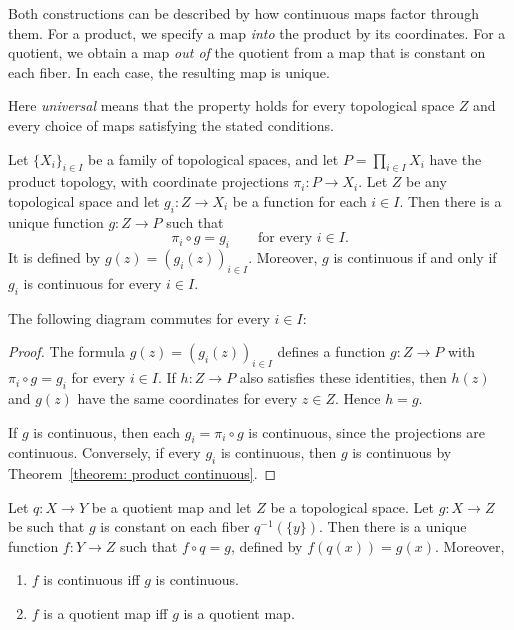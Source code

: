 Both constructions can be described by how continuous maps factor through them. For a product, we specify a map \emph{into} the product by its coordinates. For a quotient, we obtain a map \emph{out of} the quotient from a map that is constant on each fiber. In each case, the resulting map is unique.

Here \emph{universal} means that the property holds for every topological space $Z$ and every choice of maps satisfying the stated conditions.

\begin{theorem}
\label{theorem: product universal property}
Let $\{X_i\}_{i\in I}$ be a family of topological spaces, and let $P=\prod_{i\in I}X_i$ have the product topology, with coordinate projections $\pi_i:P\to X_i$. Let $Z$ be any topological space and let $g_i:Z\to X_i$ be a function for each $i\in I$. Then there is a unique function $g:Z\to P$ such that
\[
  \pi_i\circ g=g_i\qquad\text{for every }i\in I.
\]
It is defined by $g(z)=(g_i(z))_{i\in I}$. Moreover, $g$ is continuous if and only if $g_i$ is continuous for every $i\in I$.
\end{theorem}

The following diagram commutes for every $i\in I$:
\begin{center}
\end{center}
\begin{proof}
The formula $g(z)=(g_i(z))_{i\in I}$ defines a function $g:Z\to P$ with $\pi_i\circ g=g_i$ for every $i\in I$. If $h:Z\to P$ also satisfies these identities, then $h(z)$ and $g(z)$ have the same coordinates for every $z\in Z$. Hence $h=g$.

If $g$ is continuous, then each $g_i=\pi_i\circ g$ is continuous, since the projections are continuous. Conversely, if every $g_i$ is continuous, then $g$ is continuous by Theorem~\ref{theorem: product continuous}.
\end{proof}

\begin{theorem}
Let $q:X\to Y$ be a quotient map and let $Z$ be a topological space. Let $g:X\to Z$ be such that $g$ is constant on each fiber $q^{-1}(\{y\})$. Then there is a unique function $f:Y\to Z$ such that $f\circ q=g$, defined by $f(q(x))=g(x)$. Moreover,
\begin{enumerate}
  \item $f$ is continuous iff $g$ is continuous.
  \item $f$ is a quotient map iff $g$ is a quotient map.
\end{enumerate} 
\end{theorem}

